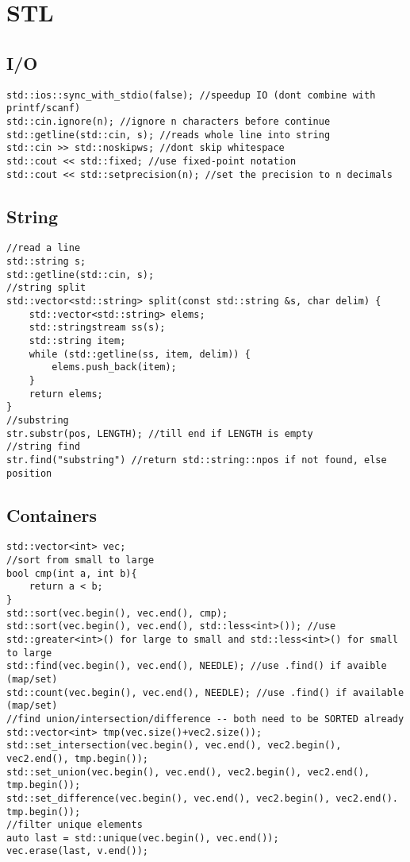 \section{STL}
\subsection{I/O}
\begin{verbatim}
std::ios::sync_with_stdio(false); //speedup IO (dont combine with printf/scanf)
std::cin.ignore(n); //ignore n characters before continue
std::getline(std::cin, s); //reads whole line into string
std::cin >> std::noskipws; //dont skip whitespace
std::cout << std::fixed; //use fixed-point notation
std::cout << std::setprecision(n); //set the precision to n decimals
\end{verbatim}
\subsection{String}
\begin{verbatim}
//read a line
std::string s;
std::getline(std::cin, s);
//string split
std::vector<std::string> split(const std::string &s, char delim) {
    std::vector<std::string> elems;
    std::stringstream ss(s);
    std::string item;
    while (std::getline(ss, item, delim)) {
        elems.push_back(item);
    }
    return elems;
}
//substring
str.substr(pos, LENGTH); //till end if LENGTH is empty
//string find
str.find("substring") //return std::string::npos if not found, else position
\end{verbatim}

\subsection{Containers}
\begin{verbatim}
std::vector<int> vec;
//sort from small to large
bool cmp(int a, int b){
    return a < b;
}
std::sort(vec.begin(), vec.end(), cmp); 
std::sort(vec.begin(), vec.end(), std::less<int>()); //use std::greater<int>() for large to small and std::less<int>() for small to large
std::find(vec.begin(), vec.end(), NEEDLE); //use .find() if avaible (map/set)
std::count(vec.begin(), vec.end(), NEEDLE); //use .find() if available (map/set)
//find union/intersection/difference -- both need to be SORTED already
std::vector<int> tmp(vec.size()+vec2.size());
std::set_intersection(vec.begin(), vec.end(), vec2.begin(), vec2.end(), tmp.begin());
std::set_union(vec.begin(), vec.end(), vec2.begin(), vec2.end(), tmp.begin());
std::set_difference(vec.begin(), vec.end(), vec2.begin(), vec2.end(). tmp.begin());
//filter unique elements
auto last = std::unique(vec.begin(), vec.end());
vec.erase(last, v.end());
\end{verbatim}

